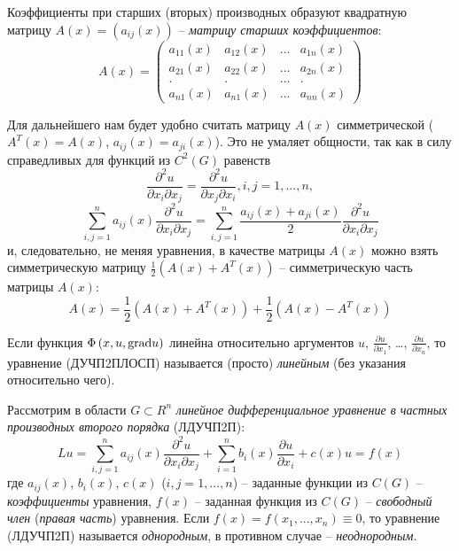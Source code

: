 \noindent
\begin{definition}
	Коэффициенты при старших (вторых) производных образуют квадратную матрицу $A(x)=(a_{ij} (x))$ -- \textit{матрицу старших коэффициентов}:
	\[A(x)=\left(\begin{array}{cccc} {a_{11} (x)} & {a_{12} (x)} & {...} & {a_{1n} (x)} \\ {a_{21} (x)} & {a_{22} (x)} & {...} & {a_{2n} (x)} \\ {.} & {.} & {...} & {.} \\ {a_{n1} (x)} & {a_{n1} (x)} & {...} & {a_{nn} (x)} \end{array}\right)\]
\end{definition}

Для дальнейшего нам будет удобно считать матрицу $A(x)$ симметрической ($A^{T} (x)=A(x)$, $a_{ij} (x)=a_{ji} (x)$). Это не умаляет общности, так как в силу справедливых для функций из $C^{2} (G)$ равенств
\[\frac{\partial ^{2} u}{\partial x_{i} \partial x_{j} } =\frac{\partial ^{2} u}{\partial x_{j} \partial x_{i} } ,  i,j=1,...,n,\]
\[\sum _{i,j=1}^{n}a_{ij} (x)\frac{\partial ^{2} u}{\partial x_{i} \partial x_{j} }  =\sum _{i,j=1}^{n}\frac{a_{ij} (x)+a_{ji} (x)}{2} \frac{\partial ^{2} u}{\partial x_{i} \partial x_{j} }  \]
и, следовательно, не меняя уравнения, в качестве матрицы $A(x)$ можно взять симметрическую матрицу $\frac{1}{2} (A(x)+A^{T} (x))$ -- симметрическую часть матрицы $A(x)$:
\[A(x)=\frac{1}{2} (A(x)+A^{T} (x))+\frac{1}{2} (A(x)-A^{T} (x))\]

\noindent

\begin{note}
	Если функция $\Phi \left(x,u,{\rm grad}u\right)$ линейна относительно аргументов $u$, $\frac{\partial u}{\partial x_{1} } $, {\dots}, $\frac{\partial u}{\partial x_{n} } $, то уравнение (ДУЧП2ПЛОСП) называется (просто) \textit{линейным} (без указания относительно чего).
\end{note}

\noindent

Рассмотрим в области $G\subset \mathit{R}^{n} $ \textit{линейное дифференциальное уравнение в частных производных второго порядка} (ЛДУЧП2П):
\[Lu=\sum _{i,j=1}^{n}a_{ij} (x)\frac{\partial ^{2} u}{\partial x_{i} \partial x_{j} }  +\sum _{i=1}^{n}b_{i} (x)\frac{\partial u}{\partial x_{i} }  +c(x)u=f(x)\]
где $a_{ij} (x)$, $b_{i} (x)$, $c(x)$ ($i,j=1,...,n$) -- заданные функции из $C(G)$ -- \textit{коэффициенты} уравнения, $f(x)$ -- заданная функция из $C(G)$ -- \textit{свободный член} (\textit{правая часть}) уравнения. Если $f(x)=f(x_{1} ,...,x_{n} )\equiv 0$, то уравнение (ЛДУЧП2П) называется \textit{однородным}, в противном случае -- \textit{неоднородным}.

